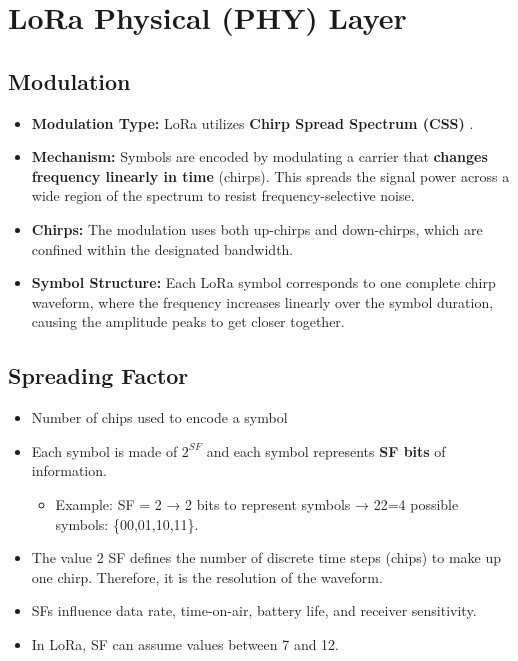 \documentclass[a4paper, 12pt]{book} %
\begin{document}
\chapter{LoRa Physical (PHY) Layer}\label{lora-physical-phy-layer}

\section{Modulation}\label{modulation}

\begin{itemize}
\tightlist
\item
  \textbf{Modulation Type:} LoRa utilizes \textbf{Chirp Spread Spectrum
  (CSS)} .
\item
  \textbf{Mechanism:} Symbols are encoded by modulating a carrier that
  \textbf{changes frequency linearly in time} (chirps). This spreads the
  signal power across a wide region of the spectrum to resist
  frequency-selective noise.
\item
  \textbf{Chirps:} The modulation uses both up-chirps and down-chirps,
  which are confined within the designated bandwidth.
\item
  \textbf{Symbol Structure:} Each LoRa symbol corresponds to one
  complete chirp waveform, where the frequency increases linearly over
  the symbol duration, causing the amplitude peaks to get closer
  together.
\end{itemize}

\section{Spreading Factor}\label{spreading-factor}

\begin{itemize}
\tightlist
\item
  Number of chips used to encode a symbol
\item
  Each symbol is made of \(2^{SF}\) and each symbol represents
  \textbf{SF bits} of information.

  \begin{itemize}
  \tightlist
  \item
    Example: SF = 2 → 2 bits to represent symbols → 22=4 possible
    symbols: \{00,01,10,11\}.
  \end{itemize}
\item
  The value 2 SF defines the number of discrete time steps (chips) to
  make up one chirp. Therefore, it is the resolution of the waveform.
\item
  SFs influence data rate, time-on-air, battery life, and receiver
  sensitivity.
\item
  In LoRa, SF can assume values between 7 and 12.
\end{itemize}
\end{document}
